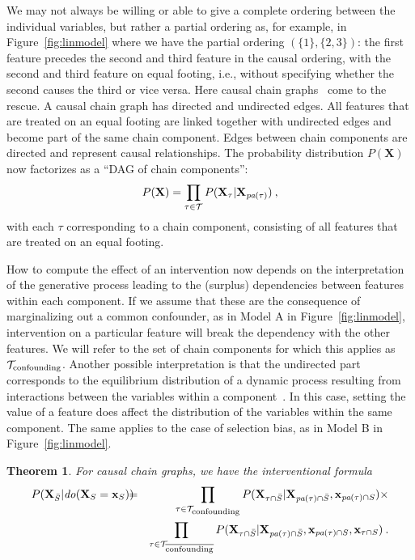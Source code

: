 \documentclass{article}
\newcommand{\vX}{\mathbf{X}}
\newcommand{\vx}{\mathbf{x}}
\newcommand{\dodo}{\mathit{do}}
\newcommand{\lvdo}[1]{\dodo(\vX_{#1} = \vx_{#1})}
\newcommand{\spa}{\mathop{\textit{\scriptsize pa}}}
\newcommand{\onder}[2]{{#1}_{\mbox{\scriptsize #2}}}
\newcommand{\isequal}{\hspace*{-2.5mm} & = & \hspace*{-2.5mm}}
\newcommand{\chaincomponents}{{\cal T}}
\newtheorem{theorem}{Theorem}
\begin{document}
We may not always be willing or able to give a complete ordering between the individual variables, but rather a partial ordering as, for example, in Figure~\ref{fig:linmodel} where we have the partial ordering $(\{1\},\{2,3\})$: the first feature precedes the second and third feature in the causal ordering, with the second and third feature on equal footing, i.e., without specifying whether the second causes the third or vice versa. Here causal chain graphs~\cite{lauritzen2002chain} come to the rescue. A causal chain graph has directed and undirected edges. All features that are treated on an equal footing are linked together with undirected edges and become part of the same chain component. Edges between chain components are directed and represent causal relationships. The probability distribution $P(\vX)$ now factorizes as a ``DAG of chain components'':
\[
P(\vX) = \prod_{\tau \in \chaincomponents} P(\vX_\tau|\vX_{\spa(\tau)}) \: ,
\]
with each $\tau$ corresponding to a chain component, consisting of all features that are treated on an equal footing.

How to compute the effect of an intervention now depends on the interpretation of the generative process leading to the (surplus) dependencies between features within each component. If we assume that these are the consequence of marginalizing out a common confounder, as in Model A in Figure~\ref{fig:linmodel}, intervention on a particular feature will break the dependency with the other features. We will refer to the set of chain components for which this applies as $\onder{\chaincomponents}{confounding}$. Another possible interpretation is that the undirected part corresponds to the equilibrium distribution of a dynamic process resulting from interactions between the variables within a component~\cite{lauritzen2002chain}. In this case, setting the value of a feature does affect the distribution of the variables within the same component. The same applies to the case of selection bias, as in Model B in Figure~\ref{fig:linmodel}.

\begin{theorem}
For causal chain graphs, we have the interventional formula
\begin{eqnarray*}
P(\vX_{\bar{S}}|\lvdo{S}) \isequal \prod_{\tau \in \chaincomponents_{\textrm{\upshape \scriptsize confounding}}} P(\vX_{\tau \cap \bar{S}}|\vX_{\spa(\tau)  \cap \bar{S}},\vx_{\spa(\tau) \cap S}) \times \\
&& \prod_{\tau \in \chaincomponents_{\overline{\textrm{\upshape \scriptsize confounding}}}} P(\vX_{\tau \cap \bar{S}}|\vX_{\spa(\tau) \cap \bar{S}},\vx_{\spa(\tau) \cap S},\vx_{\tau \cap S}) \: .
\end{eqnarray*}
\end{theorem}
\end{document}
